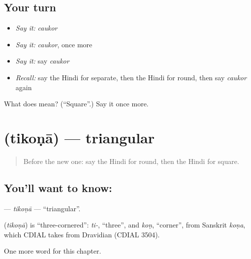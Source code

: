 \subsection*{Your turn}
\begin{itemize}
\raggedright
  \item \emph{Say it:} \emph{caukor}
  \item \emph{Say it:} \emph{caukor}, once more
  \item \emph{Say it:} say \emph{caukor}
  \item \emph{Recall:} say the Hindi for separate, then the Hindi for round, then say \emph{caukor} again
\end{itemize}

\begin{tcolorbox}[breakable,colback=teal!4,colframe=teal!35!black,title={Before you move on}]
What does  mean? (\textquotedblleft{}Square\textquotedblright{}.) Say it once more.
\end{tcolorbox}
\section[\texorpdfstring{\hi{तिकोना} (tikoṇā)}{तिकोना (tikoṇā)}]{ (tikoṇā) — triangular}

\label{lesson:HI-C237-tikona}



\begin{quote}
Before the new one: say the Hindi for round, then the Hindi for square.
\end{quote}

\subsection*{You'll want to know: }
\textbf{} — \emph{tikoṇā} — \textquotedblleft{}triangular\textquotedblright{}.

\begin{cousinweb}
\textbf{} (\emph{tikoṇā}) is \textquotedblleft{}three-cornered\textquotedblright{}: \emph{ti-}, \textquotedblleft{}three\textquotedblright{}, and \emph{koṇ}, \textquotedblleft{}corner\textquotedblright{}, from Sanskrit \emph{koṇa}, which CDIAL takes from Dravidian (CDIAL 3504).
\end{cousinweb}

\begin{grammarlens}[title={What you've built}]
One more word for this chapter.
\end{grammarlens}

